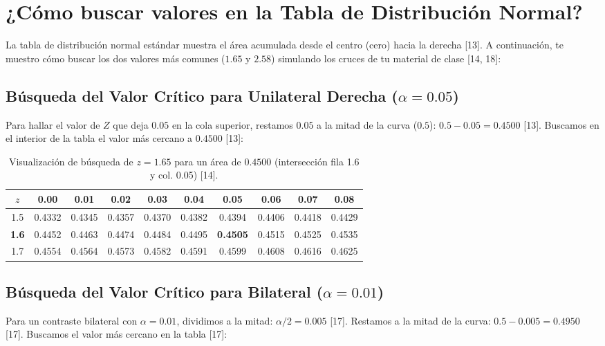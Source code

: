 \documentclass{article}
\begin{document}
\section{¿Cómo buscar valores en la Tabla de Distribución Normal?}

La tabla de distribución normal estándar muestra el área acumulada desde el centro (cero) hacia la derecha [13]. A continuación, te muestro cómo buscar los dos valores más comunes ($1.65$ y $2.58$) simulando los cruces de tu material de clase [14, 18]:

\subsection{Búsqueda del Valor Crítico para Unilateral Derecha ($\alpha = 0.05$)}
Para hallar el valor de $Z$ que deja $0.05$ en la cola superior, restamos $0.05$ a la mitad de la curva ($0.5$): $0.5 - 0.05 = 0.4500$ [13]. Buscamos en el interior de la tabla el valor más cercano a $0.4500$ [13]:

\begin{table}[h!]
\centering
\small
\begin{tabular}{cccccccccc}
\toprule
\textbf{$z$} & \textbf{0.00} & \textbf{0.01} & \textbf{0.02} & \textbf{0.03} & \textbf{0.04} & \cellcolor{red!20}\textbf{0.05} & \textbf{0.06} & \textbf{0.07} & \textbf{0.08} \\
\midrule
1.5 & 0.4332 & 0.4345 & 0.4357 & 0.4370 & 0.4382 & 0.4394 & 0.4406 & 0.4418 & 0.4429 \\
\rowcolor{red!10}
\textbf{1.6} & 0.4452 & 0.4463 & 0.4474 & 0.4484 & 0.4495 & \cellcolor{red!30}\textbf{0.4505} & 0.4515 & 0.4525 & 0.4535 \\
1.7 & 0.4554 & 0.4564 & 0.4573 & 0.4582 & 0.4591 & 0.4599 & 0.4608 & 0.4616 & 0.4625 \\
\bottomrule
\end{tabular}
\caption{Visualización de búsqueda de $z = 1.65$ para un área de $0.4500$ (intersección fila 1.6 y col. 0.05) [14].}
\end{table}

\subsection{Búsqueda del Valor Crítico para Bilateral ($\alpha = 0.01$)}
Para un contraste bilateral con $\alpha = 0.01$, dividimos a la mitad: $\alpha/2 = 0.005$ [17]. Restamos a la mitad de la curva: $0.5 - 0.005 = 0.4950$ [17]. Buscamos el valor más cercano en la tabla [17]:
\end{document}
